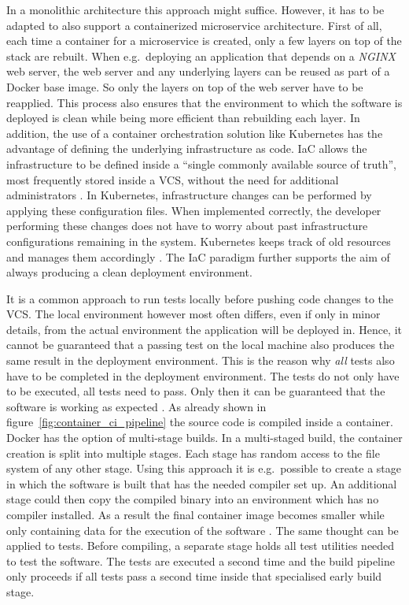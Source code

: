 In a monolithic architecture this approach might suffice. However, it has to be
adapted to also support a containerized microservice architecture. First of
all, each time a container for a microservice is created, only a few layers on
top of the stack are rebuilt. When e.g.\ deploying an application that depends
on a \textit{NGINX} web server, the web server and any underlying layers can be
reused as part of a Docker base image. So only the layers on top of the web
server have to be reapplied. This process also ensures that the environment to
which the software is deployed is clean while being more efficient than
rebuilding each layer. In addition, the use of a container orchestration
solution like Kubernetes has the advantage of defining the underlying
infrastructure as code. \ac{IaC} allows the infrastructure to be defined inside
a \enquote{single commonly available source of truth}, most frequently stored
inside a \ac{VCS}, without the need for additional administrators
\autocite{ArtacDevOpsIntroducingInfrastructure2017}. In Kubernetes,
infrastructure changes can be performed by applying these configuration files.
When implemented correctly, the developer performing these changes does not have
to worry about past infrastructure configurations remaining in the system.
Kubernetes keeps track of old resources and manages them accordingly
\autocite{AuthorsDeployments2019}. The \ac{IaC} paradigm further supports the
aim of always producing a clean deployment environment.

It is a common approach to run tests locally before pushing code changes to the
\ac{VCS}. The local environment however most often differs, even if only in
minor details, from the actual environment the application will be deployed in.
Hence, it cannot be guaranteed that a passing test on the local machine also
produces the same result in the deployment environment. This is the reason why
\textit{all} tests also have to be completed in the deployment environment. The
tests do not only have to be executed, all tests need to pass. Only then it can
be guaranteed that the software is working as expected \autocite[p.
196]{MatyasContinuousIntegration2007}. As already shown in
figure~\ref{fig:container_ci_pipeline} the source code is compiled inside a
container. Docker has the option of multi-stage builds. In a multi-staged
build, the container creation is split into multiple stages. Each stage has
random access to the file system of any other stage. Using this approach it is
e.g.\ possible to create a stage in which the software is built that has the
needed compiler set up. An additional stage could then copy the compiled binary
into an environment which has no compiler installed. As a result the final
container image becomes smaller while only containing data for the execution of
the software \autocite{IncUsemultistage2019}. The same thought can be applied
to tests. Before compiling, a separate stage holds all test utilities needed to
test the software. The tests are executed a second time and the build pipeline
only proceeds if all tests pass a second time inside that specialised early
build stage.

